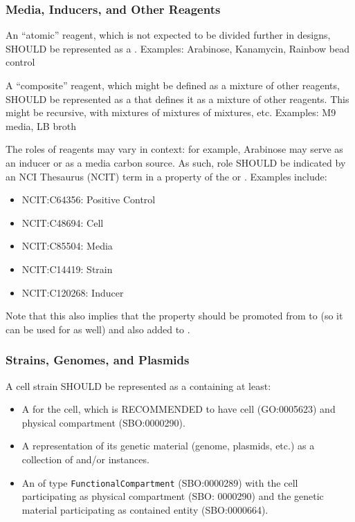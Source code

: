 \subsubsection{Media, Inducers, and Other Reagents}

An ``atomic'' reagent, which is not expected to be divided further in designs, SHOULD be represented as a \linebreak {}. Examples: Arabinose, Kanamycin, Rainbow bead control

A ``composite'' reagent, which might be defined as a mixture of other reagents, SHOULD be represented as a  that defines it as a mixture of other reagents. This might be recursive, with mixtures of mixtures of mixtures, etc. Examples: M9 media, LB broth

The roles of reagents may vary in context: for example, Arabinose may serve as an inducer or as a media carbon source. As such, role SHOULD be indicated by an NCI Thesaurus (NCIT) term in a  property of the  or . Examples include:
\begin{itemize}
\item NCIT:C64356: Positive Control
\item NCIT:C48694: Cell
\item NCIT:C85504: Media
\item NCIT:C14419: Strain
\item NCIT:C120268: Inducer
\end{itemize}

Note that this also implies that the  property should be promoted from  to  (so it can be used for  as well) and also added to .

\subsubsection{Strains, Genomes, and Plasmids}

A cell strain SHOULD be represented as a  containing at least:
\begin{itemize}
\item A  for the cell, which is RECOMMENDED to have  cell (GO:0005623) and  physical compartment (SBO:0000290).
\item A representation of its genetic material (genome, plasmids, etc.) as a collection of  and/or  instances.
\item An  of type \texttt{FunctionalCompartment} (SBO:0000289) with the cell participating as physical compartment (SBO: 0000290) and the genetic material participating as contained entity (SBO:0000664).
\end{itemize}

